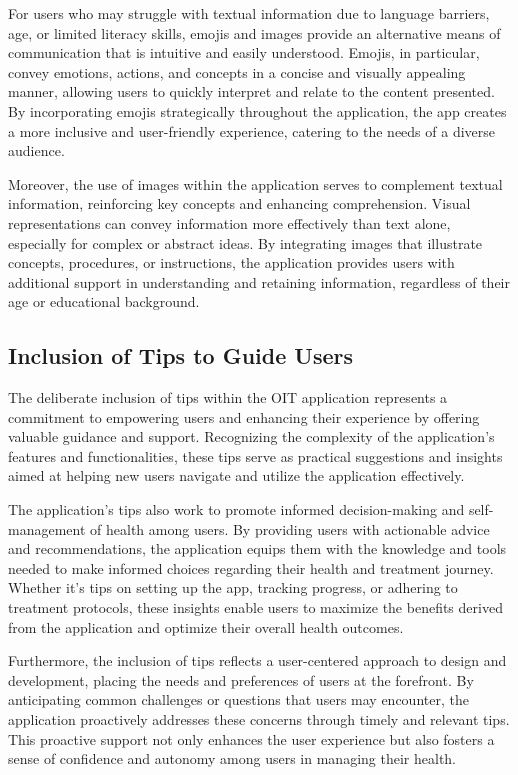 For users who may struggle with textual information due to language barriers, age, or limited literacy skills, emojis and images provide an alternative means of communication that is intuitive and easily understood. Emojis, in particular, convey emotions, actions, and concepts in a concise and visually appealing manner, allowing users to quickly interpret and relate to the content presented. By incorporating emojis strategically throughout the application, the app creates a more inclusive and user-friendly experience, catering to the needs of a diverse audience.

Moreover, the use of images within the application serves to complement textual information, reinforcing key concepts and enhancing comprehension. Visual representations can convey information more effectively than text alone, especially for complex or abstract ideas. By integrating images that illustrate concepts, procedures, or instructions, the application provides users with additional support in understanding and retaining information, regardless of their age or educational background.

\subsection{Inclusion of Tips to Guide Users}

The deliberate inclusion of tips within the OIT application represents a commitment to empowering users and enhancing their experience by offering valuable guidance and support. Recognizing the complexity of the application's features and functionalities, these tips serve as practical suggestions and insights aimed at helping new users navigate and utilize the application effectively.

The application's tips also work to promote informed decision-making and self-management of health among users. By providing users with actionable advice and recommendations, the application equips them with the knowledge and tools needed to make informed choices regarding their health and treatment journey. Whether it's tips on setting up the app, tracking progress, or adhering to treatment protocols, these insights enable users to maximize the benefits derived from the application and optimize their overall health outcomes.

Furthermore, the inclusion of tips reflects a user-centered approach to design and development, placing the needs and preferences of users at the forefront. By anticipating common challenges or questions that users may encounter, the application proactively addresses these concerns through timely and relevant tips. This proactive support not only enhances the user experience but also fosters a sense of confidence and autonomy among users in managing their health.

